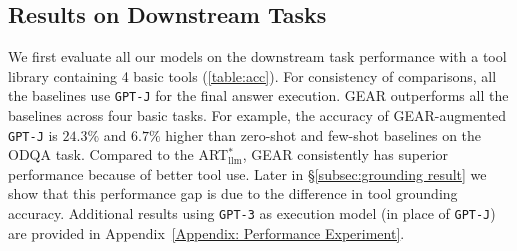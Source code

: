 \documentclass[11pt]{article}
\newcommand{\danielchange}[2]{{\color{red}{\st{#1}}{#2}}}
\newcommand{\name}{{\fontfamily{cmss}\selectfont GEAR}}
\newcommand{\gptj}{{\tt \textcolor{darkredTwo}{GPT-J}}}
\newcommand{\gptThree}{{\tt \textcolor{darkredTwo}{GPT-3}}}
\begin{document}
\subsection{Results on Downstream Tasks}
\label{subsec:downstream}
We first evaluate all our models on the downstream task performance with a tool library containing 4 basic tools (\autoref{table:acc}). For consistency of comparisons, all the baselines use \gptj{} for the final answer execution. \name{} outperforms all the baselines across four basic tasks. For example, the accuracy of \name{}-augmented \gptj{} is $24.3\%$ and $6.7\%$ higher than zero-shot and few-shot baselines on the ODQA task. Compared to the ART$^\ast_{\text{llm}}$, \name{} consistently has superior performance because of better tool use. Later in \S\ref{subsec:grounding result} we show that this performance gap is due to the difference in tool grounding accuracy.
Additional results using \gptThree{} as execution model (in place of \gptj) are provided in Appendix~\ref{Appendix: Performance Experiment}.
\end{document}
